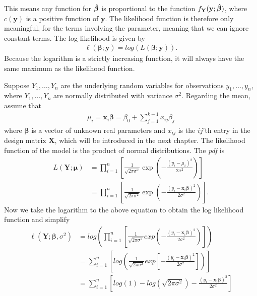 This means any function for $\operatorname{\boldsymbol{\hat{\beta}}}$ is proportional to the function $f_\textbf{Y}(\textbf{y}; \operatorname{\boldsymbol{\hat{\beta}}})$, where $c(\textbf{y})$ is a positive function of $\textbf{y}$. 
The likelihood function is therefore only meaningful, for the terms involving the parameter, meaning that we can ignore constant terms. 
The log likelihood is given by
\begin{align*}
    \ell(\boldsymbol{\beta};\textbf{y})=log(L(\boldsymbol{\beta}; \textbf{y})).
\end{align*}
Because the logarithm is a strictly increasing function, it will always have the same maximum as the likelihood function. 

\begin{example} \label{ex:model1}
Suppose $Y_1,\ldots,Y_n$ are the underlying random variables for observations $y_1,\ldots,y_n$, where $Y_1,\ldots,Y_n$ are normally distributed with variance $\sigma^2$. Regarding the mean, assume that
\begin{align*}
    \mu_i = \textbf{x}_i\boldsymbol{\beta}= \beta_0 + \sum_{j=1}^{k-1} x_{ij}\beta_j
\end{align*}
where $\boldsymbol{\beta}$ is a vector of unknown real parameters and $x_{ij}$ is the $ij$'th entry in the design matrix $\textbf{X}$, which will be introduced in the next chapter.
The likelihood function of the model is the product of normal distributions. The \textit{pdf} is 
\begin{align*}
   L(\textbf{Y};\boldsymbol{\mu}) &= \prod_{i=1}^n \left[ \frac{1}{ \sqrt{2 \pi\sigma^2}}\exp\left(-\frac{(y_i -\mu_i)^2}{2\sigma^2}\right) \right] \\
   &=  \prod_{i=1}^n \left[ \frac{1}{ \sqrt{2 \pi\sigma^2}}\exp\left(-\frac{(y_i -\textbf{x}_i\boldsymbol{\beta})^2}{2\sigma^2}\right) \right].
\end{align*}
Now we take the logarithm to the above equation to obtain the log likelihood function and simplify
\begin{align*}
   \ell(\textbf{Y};\boldsymbol{\beta}, \sigma^2) &= log \left( \prod_{i=1}^n \left[ \frac{1}{\sqrt{2 \pi \sigma^2}}exp\left(-\frac{(y_i -\textbf{x}_i\boldsymbol{\beta})^2}{2\sigma^2}\right) \right] \right)\\
   &= \sum_{i = 1}^n \left[ log\left( \frac{1}{\sqrt{2 \pi \sigma^2}}exp\left[-\frac{(y_i - \textbf{x}_i\boldsymbol{\beta})^2}{2\sigma^2}\right] \right) \right]\\
   &= \sum_{i = 1}^n \left[ log(1) - log(\sqrt{2 \pi \sigma^2}) - \frac{(y_i - \textbf{x}_i\boldsymbol{\beta})^2}{2\sigma^2} \right] \\

\end{align*}
\end{example}

